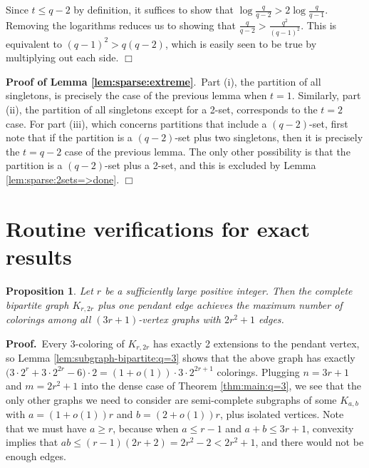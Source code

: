 \documentclass[11pt]{article}
\newtheorem{proposition}[theorem]{Proposition}
\begin{document}
Since $t \leq q-2$ by definition, it suffices to show that $\log
\frac{q}{q-2} > 2 \log \frac{q}{q-1}$.  Removing the logarithms
reduces us to showing that $\frac{q}{q-2} > \frac{q^2}{(q-1)^2}$.
This is equivalent to $(q-1)^2 > q(q-2)$, which is easily seen to be
true by multiplying out each side. \hfill $\Box$



\vspace{3mm}

\noindent \textbf{Proof of Lemma \ref{lem:sparse:extreme}}.\, Part
(i), the partition of all singletons, is precisely the case of the
previous lemma when $t=1$.  Similarly, part (ii), the partition of all
singletons except for a 2-set, corresponds to the $t=2$ case.  For
part (iii), which concerns partitions that include a $(q-2)$-set,
first note that if the partition is a $(q-2)$-set plus two singletons,
then it is precisely the $t=q-2$ case of the previous lemma.  The only
other possibility is that the partition is a $(q-2)$-set plus a 2-set,
and this is excluded by Lemma \ref{lem:sparse:2sets=>done}.  \hfill
$\Box$






\section{Routine verifications for exact results}


\begin{proposition}
  \label{prop:pendant-necessary}
  Let $r$ be a sufficiently large positive integer.  Then the complete
  bipartite graph $K_{r,2r}$ plus one pendant edge achieves the
  maximum number of colorings among all $(3r+1)$-vertex graphs with
  $2r^2 + 1$ edges.
\end{proposition}

\noindent \textbf{Proof.}\, Every 3-coloring of $K_{r,2r}$ has exactly
2 extensions to the pendant vertex, so Lemma
\ref{lem:subgraph-bipartite:q=3} shows that the above graph has
exactly $\big(3 \cdot 2^r + 3 \cdot 2^{2r} - 6\big) \cdot 2 = (1+o(1))
\cdot 3 \cdot 2^{2r+1}$ colorings.  Plugging $n = 3r+1$ and $m = 2r^2
+ 1$ into the dense case of Theorem \ref{thm:main:q=3}, we see that
the only other graphs we need to consider are semi-complete subgraphs
of some $K_{a,b}$ with $a = (1+o(1))r$ and $b = (2+o(1))r$, plus
isolated vertices.  Note that we must have $a \geq r$, because when $a
\leq r-1$ and $a+b \leq 3r+1$, convexity implies that $ab \leq
(r-1)(2r+2) = 2r^2 - 2 < 2r^2 + 1$, and there would not be enough
edges.
\end{document}
